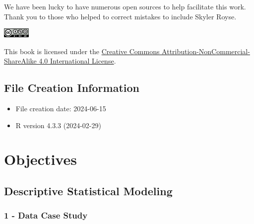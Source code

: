 \documentclass[
  letterpaper,
  DIV=11,
  numbers=noendperiod]{scrreprt}
\providecommand{\tightlist}{%
  \setlength{\itemsep}{0pt}\setlength{\parskip}{0pt}}\usepackage{longtable,booktabs,array}
\begin{document}

We have been lucky to have numerous open sources to help facilitate this
work. Thank you to those who helped to correct mistakes to include
Skyler Royse.

\includegraphics[width=0.1\textwidth,height=\textheight]{./figures/by-nc-sa.png}

This book is licensed under the
\href{http://creativecommons.org/licenses/by-nc-sa/4.0/}{Creative
Commons Attribution-NonCommercial-ShareAlike 4.0 International License}.

\section*{File Creation Information}\label{file-creation-information}


\begin{itemize}
\tightlist
\item
  File creation date: 2024-06-15
\item
  R version 4.3.3 (2024-02-29)
\end{itemize}


\chapter*{Objectives}\label{objectives}


\section*{Descriptive Statistical
Modeling}\label{descriptive-statistical-modeling}


\subsection*{1 - Data Case Study}\label{data-case-study}
\end{document}
